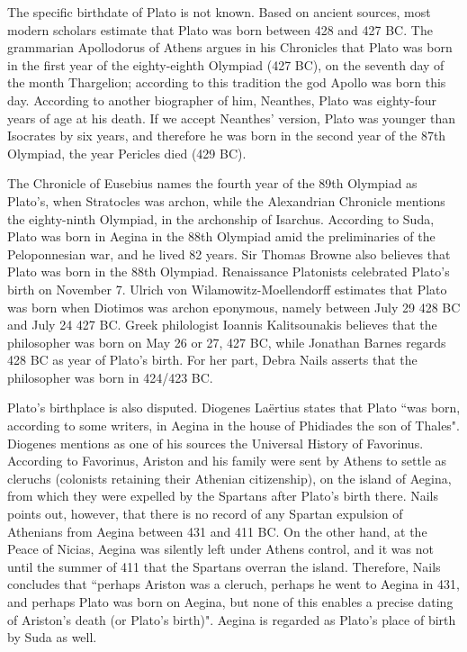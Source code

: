 \documentclass[11pt]{article}
\begin{document}
		The specific birthdate of Plato is not known. Based on ancient sources, most modern scholars estimate that Plato was born between 428 and 427 BC. The grammarian Apollodorus of Athens argues in his Chronicles that Plato was born in the first year of the eighty-eighth Olympiad (427 BC), on the seventh day of the month Thargelion; according to this tradition the god Apollo was born this day. According to another biographer of him, Neanthes, Plato was eighty-four years of age at his death. If we accept Neanthes' version, Plato was younger than Isocrates by six years, and therefore he was born in the second year of the 87th Olympiad, the year Pericles died (429 BC).

		The Chronicle of Eusebius names the fourth year of the 89th Olympiad as Plato's, when Stratocles was archon, while the Alexandrian Chronicle mentions the eighty-ninth Olympiad, in the archonship of Isarchus. According to Suda, Plato was born in Aegina in the 88th Olympiad amid the preliminaries of the Peloponnesian war, and he lived 82 years. Sir Thomas Browne also believes that Plato was born in the 88th Olympiad. Renaissance Platonists celebrated Plato's birth on November 7. Ulrich von Wilamowitz-Moellendorff estimates that Plato was born when Diotimos was archon eponymous, namely between July 29 428 BC and July 24 427 BC. Greek philologist Ioannis Kalitsounakis believes that the philosopher was born on May 26 or 27, 427 BC, while Jonathan Barnes regards 428 BC as year of Plato's birth. For her part, Debra Nails asserts that the philosopher was born in 424/423 BC.

		Plato's birthplace is also disputed. Diogenes Laërtius states that Plato ``was born, according to some writers, in Aegina in the house of Phidiades the son of Thales". Diogenes mentions as one of his sources the Universal History of Favorinus. According to Favorinus, Ariston and his family were sent by Athens to settle as cleruchs (colonists retaining their Athenian citizenship), on the island of Aegina, from which they were expelled by the Spartans after Plato's birth there. Nails points out, however, that there is no record of any Spartan expulsion of Athenians from Aegina between 431 and 411 BC. On the other hand, at the Peace of Nicias, Aegina was silently left under Athens control, and it was not until the summer of 411 that the Spartans overran the island. Therefore, Nails concludes that ``perhaps Ariston was a cleruch, perhaps he went to Aegina in 431, and perhaps Plato was born on Aegina, but none of this enables a precise dating of Ariston's death (or Plato's birth)". Aegina is regarded as Plato's place of birth by Suda as well.
\end{document}
